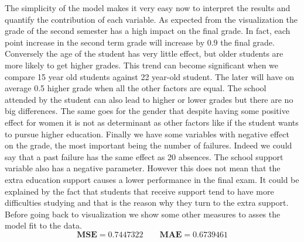 \documentclass[a4paper, 11pt]{report}
\theoremstyle{definition}
\numberwithin{equation}{section}		%
\numberwithin{table}{section}				%
\begin{document}
The simplicity of the model makes it very easy now to interpret the results and quantify the contribution of each variable. As expected from the visualization the grade of the second semester has a high impact on the final grade. In fact, each point increase in the second term grade will increase by 0.9 the final grade. Conversely the age of the student has very little effect, but older students are more likely to get higher grades. This trend can become significant when we compare 15 year old students against 22 year-old student. The later will have on average 0.5 higher grade when all the other factors are equal. The school attended by the student can also lead to higher or lower grades but there are no big differences. The same goes for the gender that despite having some positive effect for women it is not as determinant as other factors like if the student wants to pursue higher education. Finally we have some variables with negative effect on the grade, the most important being the number of failures. Indeed we could say that a past failure has the same effect as 20 absences. The school support variable also has a negative parameter. However this does not mean that the extra education support causes a lower performance in the final exam. It could be explained by the fact that students that receive support tend to have more difficulties studying and that is the reason why they turn to the extra support. 
\\[0.3in]
Before going back to visualization we show some other measures to asses the model fit to the data.
$$
\boxed{\textbf{MSE} = 0.7447322 \quad \quad \textbf{MAE} = 0.6739461}
$$
\newpage
\end{document}

